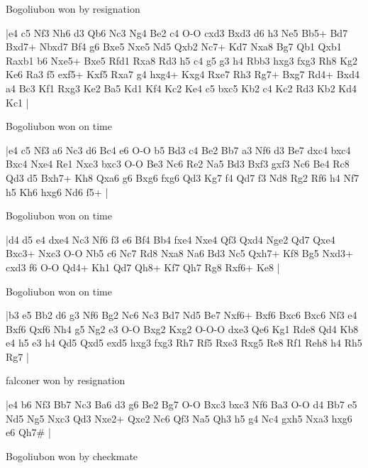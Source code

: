 \showboard

Bogoliubon won by resignation

\makegametitle
|e4 c5 Nf3 Nh6 d3 Qb6 Nc3 Ng4 Be2 c4 O-O cxd3 Bxd3 d6 h3 Ne5 Bb5+ Bd7 Bxd7+ Nbxd7 Bf4 g6 Bxe5 Nxe5 Nd5 Qxb2 Nc7+ Kd7 Nxa8 Bg7 Qb1 Qxb1 Raxb1 b6 Nxe5+ Bxe5 Rfd1 Rxa8 Rd3 h5 c4 g5 g3 h4 Rbb3 hxg3 fxg3 Rh8 Kg2 Ke6 Ra3 f5 exf5+ Kxf5 Rxa7 g4 hxg4+ Kxg4 Rxe7 Rh3 Rg7+ Bxg7 Rd4+ Bxd4 a4 Bc3 Kf1 Rxg3 Ke2 Ba5 Kd1 Kf4 Kc2 Ke4 c5 bxc5 Kb2 c4 Kc2 Rd3 Kb2 Kd4 Kc1  |

\showboard

Bogoliubon won on time

\makegametitle
|e4 c5 Nf3 a6 Nc3 d6 Bc4 e6 O-O b5 Bd3 c4 Be2 Bb7 a3 Nf6 d3 Be7 dxc4 bxc4 Bxc4 Nxe4 Re1 Nxc3 bxc3 O-O Be3 Nc6 Re2 Na5 Bd3 Bxf3 gxf3 Nc6 Be4 Rc8 Qd3 d5 Bxh7+ Kh8 Qxa6 g6 Bxg6 fxg6 Qd3 Kg7 f4 Qd7 f3 Nd8 Rg2 Rf6 h4 Nf7 h5 Kh6 hxg6 Nd6 f5+  |

\showboard

Bogoliubon won on time

\makegametitle
|d4 d5 e4 dxe4 Nc3 Nf6 f3 e6 Bf4 Bb4 fxe4 Nxe4 Qf3 Qxd4 Nge2 Qd7 Qxe4 Bxc3+ Nxc3 O-O Nb5 c6 Nc7 Rd8 Nxa8 Na6 Bd3 Nc5 Qxh7+ Kf8 Bg5 Nxd3+ cxd3 f6 O-O Qd4+ Kh1 Qd7 Qh8+ Kf7 Qh7 Rg8 Rxf6+ Ke8  |

\showboard

Bogoliubon won on time

\makegametitle
|b3 e5 Bb2 d6 g3 Nf6 Bg2 Nc6 Nc3 Bd7 Nd5 Be7 Nxf6+ Bxf6 Bxc6 Bxc6 Nf3 e4 Bxf6 Qxf6 Nh4 g5 Ng2 e3 O-O Bxg2 Kxg2 O-O-O dxe3 Qe6 Kg1 Rde8 Qd4 Kb8 e4 h5 e3 h4 Qd5 Qxd5 exd5 hxg3 fxg3 Rh7 Rf5 Rxe3 Rxg5 Re8 Rf1 Reh8 h4 Rh5 Rg7  |

\showboard

falconer won by resignation

\makegametitle
|e4 b6 Nf3 Bb7 Nc3 Ba6 d3 g6 Be2 Bg7 O-O Bxc3 bxc3 Nf6 Ba3 O-O d4 Bb7 e5 Nd5 Ng5 Nxc3 Qd3 Nxe2+ Qxe2 Nc6 Qf3 Na5 Qh3 h5 g4 Nc4 gxh5 Nxa3 hxg6 e6 Qh7\#  |

\showboard

Bogoliubon won by checkmate

